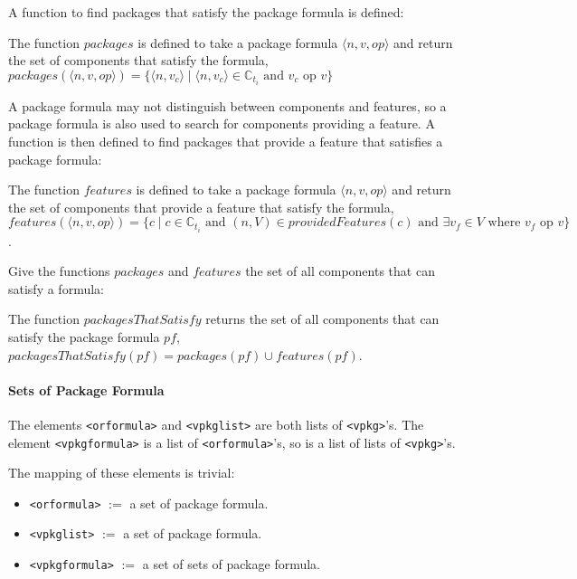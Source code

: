 A function to find packages that satisfy the package formula is defined:
\begin{defs}
The function $packages$ is defined to take a package formula $\langle n,v,op\rangle$ and return the set of components that satisfy the formula,
$packages(\langle n,v,op\rangle) = \{\langle n,v_c \rangle \mid \langle n,v_c \rangle \in \mathbb{C}_{t_i} \mbox{ and } v_c \mbox{ op } v\}$
\end{defs}

A package formula may not distinguish between components and features, so a package formula is also used to search for components providing a feature.
A function is then defined to find packages that provide a feature that satisfies a package formula:
\begin{defs}
The function $features$ is defined to take a package formula $\langle n,v,op\rangle$ and return the set of components that provide a feature that satisfy the formula,
$features(\langle n,v,op\rangle) = \{c \mid c \in \mathbb{C}_{t_i} \mbox{ and } (n,V) \in providedFeatures(c) \mbox{ and } \exists v_f \in V \mbox { where } v_f \mbox{ op } v \}$.
\end{defs}

Give the functions $packages$ and $features$ the set of all components that can satisfy a formula:
\begin{defs}
The function $packagesThatSatisfy$ returns the set of all components that can satisfy the package formula $pf$, $packagesThatSatisfy(pf) = packages(pf) \cup features(pf)$.
\end{defs}

\paragraph{Sets of Package Formula}
The elements \texttt{<orformula>} and \texttt{<vpkglist>} are both lists of \texttt{<vpkg>}'s.
The element \texttt{<vpkgformula>} is a list of \texttt{<orformula>}'s, so is a list of lists of \texttt{<vpkg>}'s.

The mapping of these elements is trivial:
\begin{itemize}
  \item \texttt{<orformula>} $ := $ a set of package formula.
  \item \texttt{<vpkglist>} $ := $ a set of package formula.
  \item \texttt{<vpkgformula>} $ := $ a set of sets of package formula.
\end{itemize}

